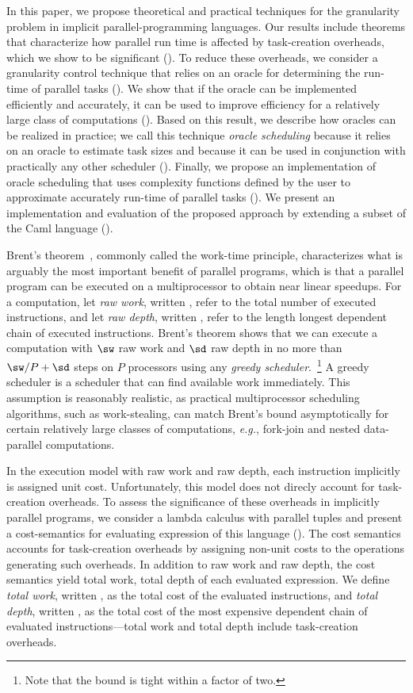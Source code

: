 In this paper, we propose theoretical and practical techniques for the
granularity problem in implicit parallel-programming languages.  Our
results include theorems that characterize how parallel run time is
affected by task-creation overheads, which we show to be significant
().  To reduce these overheads, we consider
a granularity control technique that relies on an oracle for
determining the run-time of parallel tasks ().  We
show that if the oracle can be implemented efficiently and accurately,
it can be used to improve efficiency for a relatively large class of
computations (). 
Based on this result, we describe how oracles can be
realized in practice; we call this technique {\em oracle scheduling}
because it relies on an oracle to estimate task sizes and because it
can be used in conjunction with practically any other scheduler
().  Finally, we propose an implementation of oracle
scheduling that uses complexity functions defined by the user to
approximate accurately run-time of parallel tasks ().
We present an implementation and evaluation of the proposed approach
by extending a subset of the Caml language ().

Brent's theorem~\cite{Brent74}, commonly called the work-time
principle, characterizes what is arguably the most important benefit
of parallel programs, which is that a parallel program can be executed
on a multiprocessor to obtain near linear speedups.  For a
computation, let {\em raw work}, written \sw, refer to the total
number of executed instructions, and let {\em raw depth}, written \sd,
refer to the length longest dependent chain of executed instructions.
Brent's theorem shows that we can execute a computation with $\sw$ raw
work and $\sd$ raw depth in no more than $\sw/P + \sd$ steps on $P$
processors using any \emph{greedy scheduler}.~\footnote{Note that the
  bound is tight within a factor of two.}  A greedy scheduler is a
scheduler that can find available work immediately.  This assumption
is reasonably realistic, as practical multiprocessor scheduling
algorithms, such as work-stealing, can match Brent's bound
asymptotically for certain relatively large classes of computations,
\textit{e.g.}, fork-join and nested data-parallel computations.

In the execution model with raw work and raw depth, each instruction
implicitly is assigned unit cost.  Unfortunately, this model does not
direcly account for task-creation overheads.  To assess the
significance of these overheads in implicitly parallel programs, we
consider a lambda calculus with parallel tuples and present a
cost-semantics for evaluating expression of this language
().  The cost semantics accounts for
task-creation overheads by assigning non-unit costs to the operations
generating such overheads.  In addition to raw work and raw depth, the
cost semantics yield total work, total depth of each evaluated
expression.  We define {\em total work}, written \sws, as the total
cost of the evaluated instructions, and {\em total depth}, written
\sds, as the total cost of the most expensive dependent chain of
evaluated instructions---total work and total depth include
task-creation overheads.


